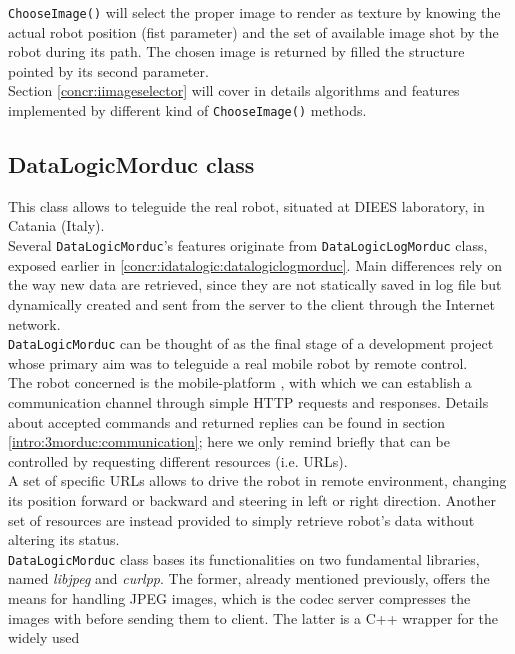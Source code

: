 \texttt{ChooseImage()} will select the proper image to render as texture
by knowing the actual robot position (fist parameter) and the set of available
image shot by the robot during its path. The chosen image is returned by filled
the structure pointed by its second parameter.
\\
Section \ref{concr:iimageselector} will cover in details algorithms and
features implemented by different kind of \texttt{ChooseImage()} methods.

\subsection{DataLogicMorduc class}
\label{concr:idatalogic:datalogicmorduc}

This class allows \framework{} to teleguide the real \morduc{}
robot, situated at DIEES laboratory, in Catania (Italy).
\\
Several \texttt{DataLogicMorduc}'s features originate 
from \texttt{DataLogicLogMorduc} class, exposed earlier in
\ref{concr:idatalogic:datalogiclogmorduc}. Main differences
rely on the way new data are retrieved, since they are not
statically saved in log file but dynamically created and sent
from the server to the client through the Internet network.
\\
\texttt{DataLogicMorduc} can be thought of as the final
stage of a development project whose primary aim was
to teleguide a real mobile robot by remote control.
\\
The
robot concerned is the mobile-platform \morduc{}, with which
we can
establish a communication channel through simple
HTTP requests and responses. Details about accepted
commands and returned replies can be found in 
section \ref{intro:3morduc:communication}; here we only
remind briefly that \morduc{} can be controlled
by requesting different resources (i.e. URLs).
\\
A set of specific URLs allows to drive the robot in remote
environment, changing its position forward or backward and
steering in left or right direction. Another set
of resources are instead provided to simply retrieve robot's
data without altering its status.
\\
\texttt{DataLogicMorduc} class bases its functionalities
on two fundamental libraries, named \textit{libjpeg} and
\textit{curlpp}. The former, already mentioned previously,
offers the means for handling JPEG images, which is the codec
server compresses the images with before sending them to
client.
The latter is a C++ wrapper for the widely used
